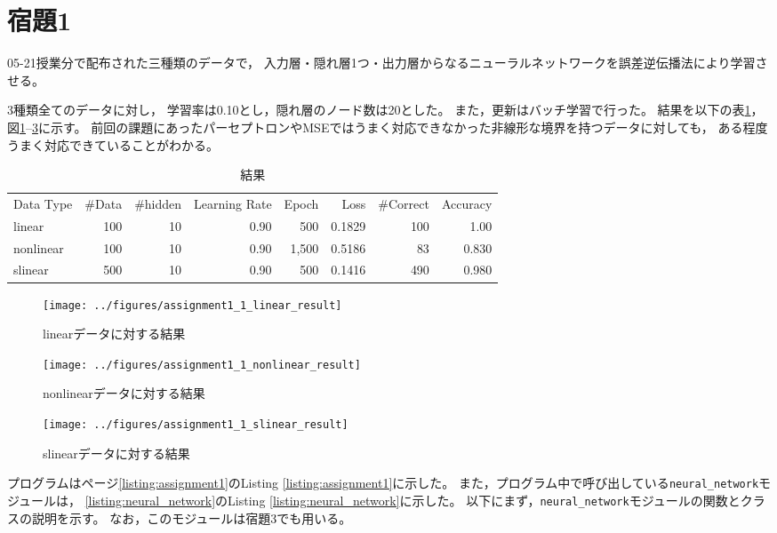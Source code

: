 \documentclass[class=jsarticle, crop=false, dvipdfmx, fleqn]{standalone}
\begin{document}
\section*{宿題1}

05-21授業分で配布された三種類のデータで，
入力層・隠れ層1つ・出力層からなるニューラルネットワークを誤差逆伝播法により学習させる。

3種類全てのデータに対し，
学習率は0.10とし，隠れ層のノード数は20とした。
また，更新はバッチ学習で行った。
結果を以下の表\ref{tab:result}，図\ref{fig:linear}--\ref{fig:slinear}に示す。
前回の課題にあったパーセプトロンやMSEではうまく対応できなかった非線形な境界を持つデータに対しても，
ある程度うまく対応できていることがわかる。


\begin{table}[H]
    \centering
    \caption{結果}
    \begin{tabular}{lrrrrrrr}
        Data Type & {\#}Data & {\#}hidden & Learning Rate & Epoch & Loss & {\#}Correct & Accuracy \\
        linear & 100 & 10 & 0.90 & 500 & 0.1829 & 100 & 1.00 \\
        nonlinear & 100 & 10 & 0.90 & 1,500 & 0.5186 & 83 & 0.830 \\
        slinear & 500 & 10 & 0.90 & 500 & 0.1416 & 490 & 0.980
    \end{tabular}
    \label{tab:result}
\end{table}

\begin{figure}[H]
    \centering
    \texttt{[image: ../figures/assignment1\_1\_linear\_result]}
    \caption{linearデータに対する結果}
    \label{fig:linear}
\end{figure}

\begin{figure}[H]
    \centering
    \texttt{[image: ../figures/assignment1\_1\_nonlinear\_result]}
    \caption{nonlinearデータに対する結果}
    \label{fig:nonlinear}
\end{figure}

\begin{figure}[H]
    \centering
    \texttt{[image: ../figures/assignment1\_1\_slinear\_result]}
    \caption{slinearデータに対する結果}
    \label{fig:slinear}
\end{figure}

\clearpage

プログラムはページ\ref{listing:assignment1}のListing \ref{listing:assignment1}に示した。
また，プログラム中で呼び出している\texttt{neural\_network}モジュールは，
\ref{listing:neural_network}のListing \ref{listing:neural_network}に示した。
以下にまず，\texttt{neural\_network}モジュールの関数とクラスの説明を示す。
なお，このモジュールは宿題3でも用いる。
\end{document}

